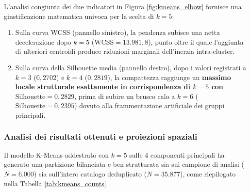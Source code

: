 \documentclass[12pt,a4paper]{article}
\begin{document}
L'analisi congiunta dei due indicatori in Figura \ref{fig:kmeans_elbow} fornisce una giustificazione matematica univoca per la scelta di \textbf{$k = 5$}:
\begin{enumerate}
    \item Sulla curva WCSS (pannello sinistro), la pendenza subisce una netta decelerazione dopo $k = 5$ ($\text{WCSS} = 13.981,8$), punto oltre il quale l'aggiunta di ulteriori centroidi produce riduzioni marginali dell'inerzia intra-cluster.
    \item Sulla curva della Silhouette media (pannello destro), dopo i valori registrati a $k=3$ ($0,2702$) e $k=4$ ($0,2819$), la compattezza raggiunge un \textbf{massimo locale strutturale esattamente in corrispondenza di $k = 5$ con $\text{Silhouette} = 0,2829$}, prima di subire un brusco calo a $k = 6$ ($\text{Silhouette} = 0,2395$) dovuto alla frammentazione artificiale dei gruppi principali.
\end{enumerate}

\subsubsection{Analisi dei risultati ottenuti e proiezioni spaziali}

Il modello K-Means addestrato con $k = 5$ sulle 4 componenti principali ha generato una partizione bilanciata e ben strutturata sia sul campione di analisi ($N = 6.000$) sia sull'intero catalogo deduplicato ($N = 35.877$), come riepilogato nella Tabella \ref{tab:kmeans_counts}.

\begin{table}[H]
\centering
\caption{Distribuzione numerica e percentuale dei brani nei 5 cluster K-Means (campione di analisi e intero catalogo deduplicato).}
\label{tab:kmeans_counts}
\vspace{0.2cm}
\end{table}
\end{document}
